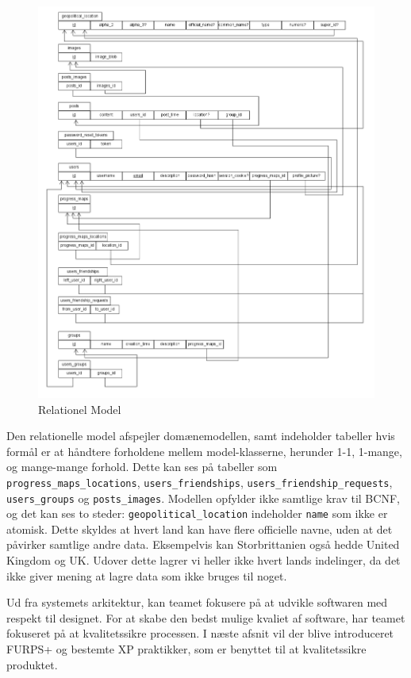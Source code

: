 \begin{figure}
    \includegraphics[width=\linewidth]{figures/RelationelmModel.png}
    \caption{Relationel Model}
    \label{fif:Rela}
\end{figure}

Den relationelle model afspejler domænemodellen, samt indeholder tabeller hvis formål er at håndtere forholdene mellem model-klasserne, herunder 1-1, 1-mange, og mange-mange forhold. Dette kan ses på tabeller som \texttt{progress\_maps\_locations}, \texttt{users\_friendships}, \texttt{users\_friendship\_requests}, \texttt{users\_groups} og \texttt{posts\_images}. Modellen opfylder ikke samtlige krav til BCNF\cite{bcnf}, og det kan ses to steder: \texttt{geopolitical\_location} indeholder \texttt{name} som ikke er atomisk. Dette skyldes at hvert land kan have flere officielle navne, uden at det påvirker samtlige andre data. Eksempelvis kan Storbrittanien også hedde United Kingdom og UK. Udover dette lagrer vi heller ikke hvert lands indelinger, da det ikke giver mening at lagre data som ikke bruges til noget. 

Ud fra systemets arkitektur, kan teamet fokusere på at udvikle softwaren med respekt til designet. For at skabe den bedst mulige kvaliet af software, har teamet fokuseret på at kvalitetssikre processen. I næste afsnit vil der blive introduceret FURPS+ og bestemte XP praktikker, som er benyttet til at kvalitetssikre produktet. 